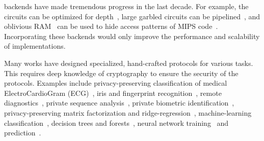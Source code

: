 \mpc backends  have made  tremendous progress in the last decade.
For example, the circuits can be optimized for depth~\cite{ddkssz15,cbmcgcdepth}, large garbled circuits can be pipelined~\cite{yao-pipe}, and oblivious RAM~\cite{oram1,oram2} can be used to hide access patterns of MIPS code~\cite{mips}. Incorporating these backends would only improve the performance and scalability of \tool implementations.

Many works have designed specialized, hand-crafted protocols for various \mpc tasks. 
This requires deep knowledge of cryptography
to ensure the security of the protocols.
Examples include privacy-preserving classification of medical ElectroCardioGram (ECG)~\cite{barni}, iris and fingerprint recognition~\cite{blanton}, remote diagnostics~\cite{brickell}, private sequence analysis~\cite{franz}, private biometric identification~\cite{huang}, privacy-preserving matrix factorization and ridge-regression~\cite{valeriaMatrix, valeriaRidge}, machine-learning classification~\cite{shafindss}, decision trees and forests~\cite{wu}, neural network training~\cite{secureml} and prediction~\cite{minionn}.
